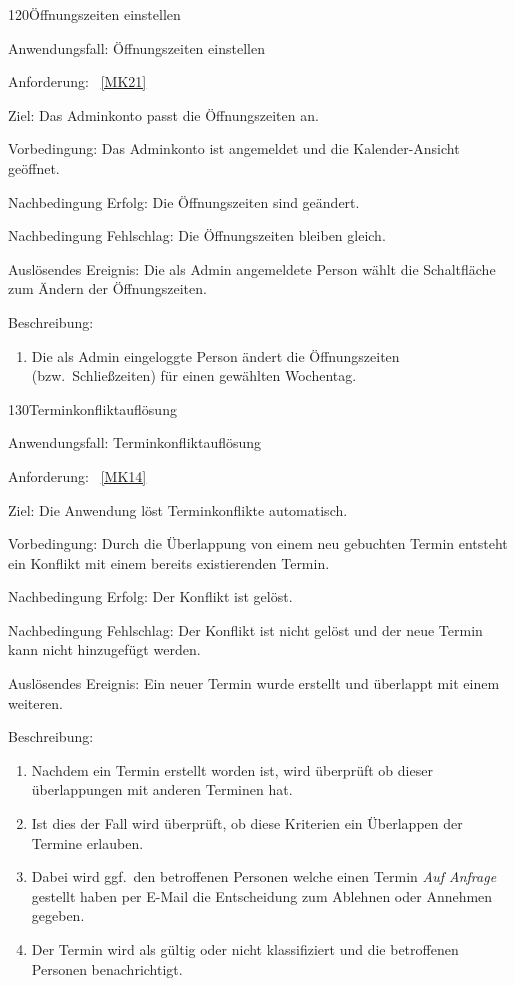 \pagebreak

\begin{function}{120}{Öffnungszeiten einstellen}
    \item[Anwendungsfall:] Öffnungszeiten einstellen
    \item[Anforderung:]~\ref{MK21}
    \item[Ziel:] Das Adminkonto passt die Öffnungszeiten an.
    \item[Vorbedingung:] Das Adminkonto ist angemeldet und die Kalender-Ansicht geöffnet.
    \item[Nachbedingung Erfolg:] Die Öffnungszeiten sind geändert.
    \item[Nachbedingung Fehlschlag:] Die Öffnungszeiten bleiben gleich.
    \item[Auslösendes Ereignis:] Die als Admin angemeldete Person wählt die Schaltfläche zum Ändern der Öffnungszeiten.
    \item[Beschreibung:] ~
    \begin{enumerate}
        \item Die als Admin eingeloggte Person ändert die Öffnungszeiten (bzw.\ Schließzeiten) für einen gewählten Wochentag.
    \end{enumerate}
\end{function}

\pagebreak

\begin{function}{130}{Terminkonfliktauflösung}
    \item[Anwendungsfall:] Terminkonfliktauflösung
    \item[Anforderung:]~\ref{MK14}
    \item[Ziel:] Die Anwendung löst Terminkonflikte automatisch.
    \item[Vorbedingung:] Durch die Überlappung von einem neu gebuchten Termin entsteht ein Konflikt mit einem bereits existierenden Termin.
    \item[Nachbedingung Erfolg:] Der Konflikt ist gelöst.
    \item[Nachbedingung Fehlschlag:] Der Konflikt ist nicht gelöst und der neue Termin kann nicht hinzugefügt werden.
    \item[Auslösendes Ereignis:] Ein neuer Termin wurde erstellt und überlappt mit einem weiteren.
    \item[Beschreibung:] ~
    \begin{enumerate}
        \item Nachdem ein Termin erstellt worden ist, wird überprüft ob dieser überlappungen mit anderen Terminen hat.
        \item Ist dies der Fall wird überprüft, ob diese Kriterien ein Überlappen der Termine erlauben.
        \item Dabei wird ggf.\ den betroffenen Personen welche einen Termin \textit{Auf Anfrage} gestellt haben per E-Mail die Entscheidung zum Ablehnen oder Annehmen gegeben.
        \item Der Termin wird als gültig oder nicht klassifiziert und die betroffenen Personen benachrichtigt.
    \end{enumerate}
\end{function}
